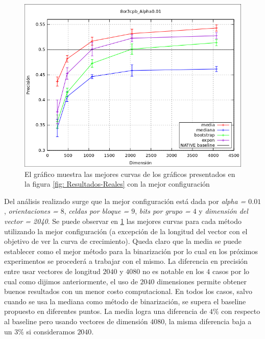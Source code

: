 			\begin{figure}[htbp]
				\centering
				\centerline{
					\includegraphics[scale=0.6]{img/resultados/reales/comparativa_metodos.png}
				}
				\caption[Reales comparativa]{El gráfico muestra las mejores curvas de los gráficos presentados en la figura \ref{fig: Resultados-Reales} con la mejor configuración}
				\label{fig: Reales-Comparativa metodos}
			\end{figure}
	
	Del análisis realizado surge que la mejor configuración está dada por \textit{alpha = $0.01$}, \textit{orientaciones = $8$}, \textit{celdas por bloque = $9$}, \textit{bits por grupo = $4$} y \textit{dimensión del vector = 2040}. Se puede observar en \ref{fig: Reales-Comparativa metodos} las mejores curvas para cada método utilizando la mejor configuración (a excepción de la longitud del vector con el objetivo de ver la curva de crecimiento). Queda claro que la media se puede establecer como el mejor método para la binarización por lo cual en los próximos experimentos se procederá a trabajar con el mismo. La diferencia en precisión entre usar vectores de longitud $2040$ y $4080$ no es notable en los $4$ casos por lo cual como dijimos anteriormente, el uso de $2040$ dimensiones permite obtener buenos resultados con un menor costo computacional. En todos los casos, salvo cuando se usa la mediana como método de binarización, se supera el baseline propuesto en diferentes puntos. La media logra una diferencia de $4\%$ con respecto al baseline pero usando vectores de dimensión $4080$, la misma diferencia baja a un $3\%$ si consideramos $2040$.
	
